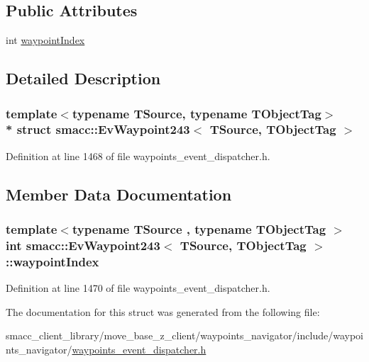\subsection*{Public Attributes}
\begin{DoxyCompactItemize}
\item 
int \hyperlink{structsmacc_1_1EvWaypoint243_a465714fbfbcbeca5b1b3794326dbb2a0}{waypoint\+Index}
\end{DoxyCompactItemize}


\subsection{Detailed Description}
\subsubsection*{template$<$typename T\+Source, typename T\+Object\+Tag$>$\\*
struct smacc\+::\+Ev\+Waypoint243$<$ T\+Source, T\+Object\+Tag $>$}



Definition at line 1468 of file waypoints\+\_\+event\+\_\+dispatcher.\+h.



\subsection{Member Data Documentation}
\subsubsection[{\texorpdfstring{waypoint\+Index}{waypointIndex}}]{\setlength{\rightskip}{0pt plus 5cm}template$<$typename T\+Source , typename T\+Object\+Tag $>$ int {\bf smacc\+::\+Ev\+Waypoint243}$<$ T\+Source, T\+Object\+Tag $>$\+::waypoint\+Index}\hypertarget{structsmacc_1_1EvWaypoint243_a465714fbfbcbeca5b1b3794326dbb2a0}{}\label{structsmacc_1_1EvWaypoint243_a465714fbfbcbeca5b1b3794326dbb2a0}


Definition at line 1470 of file waypoints\+\_\+event\+\_\+dispatcher.\+h.



The documentation for this struct was generated from the following file\+:\begin{DoxyCompactItemize}
\item 
smacc\+\_\+client\+\_\+library/move\+\_\+base\+\_\+z\+\_\+client/waypoints\+\_\+navigator/include/waypoints\+\_\+navigator/\hyperlink{waypoints__event__dispatcher_8h}{waypoints\+\_\+event\+\_\+dispatcher.\+h}\end{DoxyCompactItemize}
